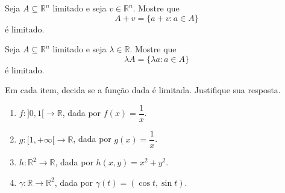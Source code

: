 \begin{exercise}
    Seja $A\subseteq\mathbb R^n$ limitado e seja $v\in\mathbb R^n$.
    Mostre que
    \[
        A+v=\{a+v:a\in A\}
    \]
    é limitado.
\end{exercise}

\begin{exercise}
    Seja $A\subseteq\mathbb R^n$ limitado e seja $\lambda \in \mathbb R$.
    Mostre que
    \[
        \lambda A=\{\lambda a:a\in A\}
    \]
    é limitado.
\end{exercise}

\begin{exercise}
    Em cada item, decida se a função dada é limitada.
    Justifique sua resposta.

    \begin{enumerate}[label=(\alph*)]
        \item $f:]0,1[\to\mathbb R$, dada por $f(x)=\dfrac{1}{x}$.
        \item $g:[1,+\infty[\to\mathbb R$, dada por $g(x)=\dfrac{1}{x}$.
        \item $h:\mathbb R^2\to\mathbb R$, dada por $h(x,y)=x^2+y^2$.
        \item $\gamma:\mathbb R\to\mathbb R^2$, dada por $\gamma(t)=(\cos t,\sin t)$.
    \end{enumerate}
\end{exercise}

